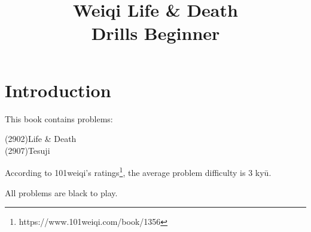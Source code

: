 \title{Weiqi Life \& Death\\Drills Beginner}

\chapter*{Introduction}%
\thispagestyle{empty}%
This book contains \countproblems{} problems:

(2902)\:\:Life \& Death\\
(2907)\:\:Tesuji

According to 101weiqi's ratings\footnote{https://www.101weiqi.com/book/1356}, the average problem difficulty is 3 ky\=u.

All problems are black to play.

\renderproblems
\rendersolutions


